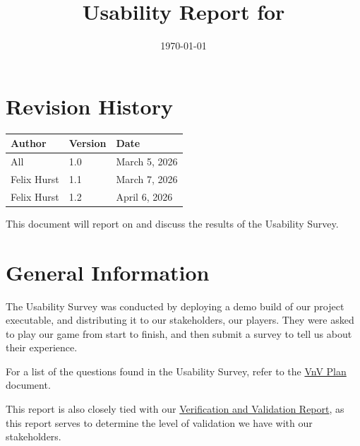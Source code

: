 \documentclass[12pt, titlepage]{article}
\begin{document}
\title{Usability Report for \progname{}} 
\author{\authname}
\date{\today}
	
\maketitle


\section*{Revision History}

\begin{tabularx}{\textwidth}{p{5cm}p{2cm}X}
\toprule {\bf Author} & {\bf Version}& {\bf Date}\\
\midrule
All & 1.0 & March 5, 2026\\
Felix Hurst & 1.1 & March 7, 2026\\
Felix Hurst & 1.2 & April 6, 2026\\
\bottomrule
\end{tabularx}

\newpage

\tableofcontents
\newpage



This document will report on and discuss the results of the Usability Survey.

\section{General Information}
The Usability Survey was conducted by deploying a demo build of our project
executable, and distributing it to our stakeholders, our players. They were asked
to play our game from start to finish, and then submit a survey to tell us about 
their experience.

For a list of the questions found in the Usability Survey, refer to the
\href{https://github.com/felix-hurst/Ad-Natura/blob/main/docs/VnVPlan/VnVPlan.pdf}{VnV Plan} document.

This report is also closely tied with our
\href{https://github.com/felix-hurst/Ad-Natura/blob/main/docs/VnVReport/VnVReport.pdf}{Verification and Validation Report},
as this report serves to determine the level of validation we have with our stakeholders.
\end{document}
